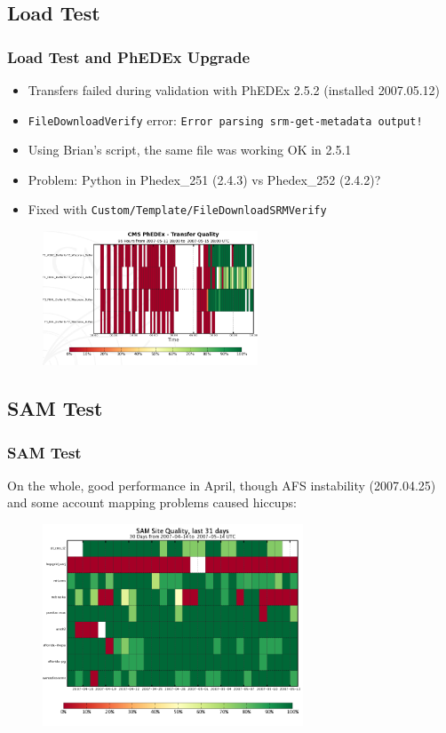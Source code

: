\documentclass{beamer}
\begin{document}
\subsection{Load Test}
\begin{frame}
\frametitle{Load Test and PhEDEx Upgrade}
\begin{itemize}
    \item Transfers failed during validation with PhEDEx 2.5.2 (installed 2007.05.12)
    \item {\tt FileDownloadVerify} error: {\tt Error parsing srm-get-metadata output!}
    \item Using Brian's script, the same file was working OK in 2.5.1
    \item Problem: Python in Phedex\_251 (2.4.3) vs Phedex\_252 (2.4.2)?
    \item Fixed with {\tt Custom/Template/FileDownloadSRMVerify}
\end{itemize}

\begin{figure}
    \includegraphics*[height=4cm]{Graphics/phedex_252_wisc_quality.png}
\end{figure}

\end{frame}

\subsection{SAM Test}
\begin{frame}
\frametitle{SAM Test}
On the whole, good performance in April, though AFS instability (2007.04.25) 
and some account mapping problems caused hiccups:
\begin{figure}
    \includegraphics*[height=6cm]{Graphics/osg_sam_quality.png}
\end{figure}
\end{frame}
\end{document}
